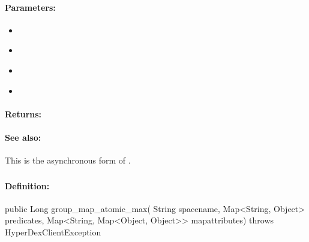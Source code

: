 \paragraph{Parameters:}
\begin{itemize}[noitemsep]
\item {}\\

\item {}\\

\item {}\\

\item {}\\

\end{itemize}

\paragraph{Returns:}


\paragraph{See also:}  This is the asynchronous form of .

\pagebreak
\subsubsection{}
\label{api:java:group_map_atomic_max}


\paragraph{Definition:}
\begin{javacode}
public Long group_map_atomic_max(
        String spacename,
        Map<String, Object> predicates,
        Map<String, Map<Object, Object>> mapattributes) throws HyperDexClientException
\end{javacode}

